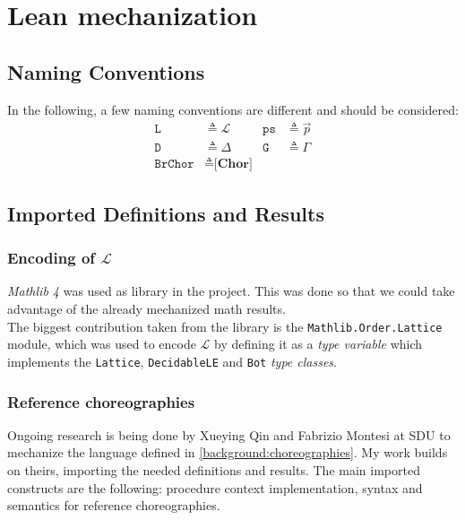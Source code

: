 \documentclass[12pt,a4paper,twoside]{book}
\newcommand{\MCL}{\mathscr{L}}
\begin{document}
\chapter{Lean mechanization}
\section{Naming Conventions}
In the following, a few naming conventions are different and should be considered:
\begin{align*}
\texttt{L} &\triangleq \MCL &\texttt{ps} &\triangleq \vec{p}\\
\texttt{D} &\triangleq \Delta & \texttt{G} &\triangleq \Gamma\\
\texttt{BrChor} &\triangleq \textbf{[Chor]}
\end{align*}

\section{Imported Definitions and Results}
\label{lean:imports}
\subsection{Encoding of $\MCL$}
\emph{Mathlib 4}\cite{mathlib4} was used as library in the project. This was done so that we could take advantage of the already mechanized math results.\\
The biggest contribution taken from the library is the \texttt{Mathlib.Order.Lattice} module, which was used to encode $\MCL$ by defining it as a \emph{type variable} which implements the \texttt{Lattice}, \texttt{DecidableLE} and \texttt{Bot} \emph{type classes}.
\subsection{Reference choreographies}
Ongoing research is being done by Xueying Qin and Fabrizio Montesi at SDU to mechanize the language defined in \ref{background:choreographies}.
My work builds on theirs, importing the needed definitions and results. The main imported constructs are the following: procedure context implementation, syntax and semantics for reference choreographies.
\end{document}
